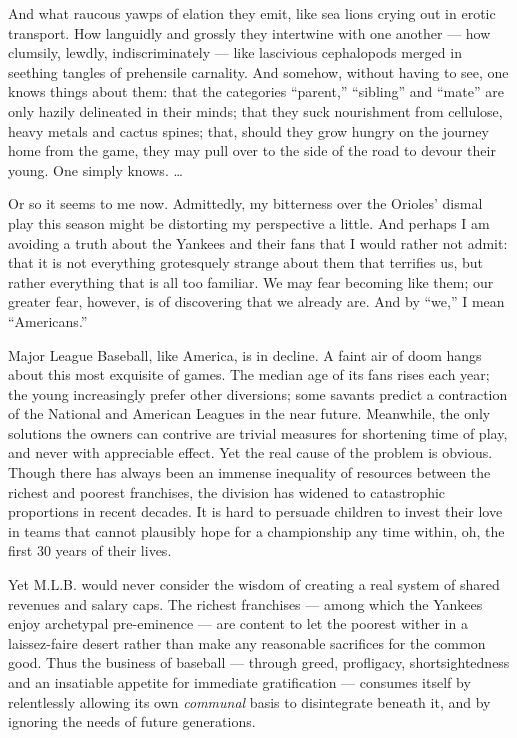 And what raucous yawps of elation they emit, like sea lions crying out
in erotic transport. How languidly and grossly they intertwine with one
another --- how clumsily, lewdly, indiscriminately --- like lascivious
cephalopods merged in seething tangles of prehensile carnality. And
somehow, without having to see, one knows things about them: that the
categories ``parent,'' ``sibling'' and ``mate'' are only hazily
delineated in their minds; that they suck nourishment from cellulose,
heavy metals and cactus spines; that, should they grow hungry on the
journey home from the game, they may pull over to the side of the road
to devour their young. One simply knows. \ldots{}

Or so it seems to me now. Admittedly, my bitterness over the Orioles'
dismal play this season might be distorting my perspective a little. And
perhaps I am avoiding a truth about the Yankees and their fans that I
would rather not admit: that it is not everything grotesquely strange
about them that terrifies us, but rather everything that is all too
familiar. We may fear becoming like them; our greater fear, however, is
of discovering that we already are. And by ``we,'' I mean ``Americans.''

Major League Baseball, like America, is in decline. A faint air of doom
hangs about this most exquisite of games. The median age of its fans
rises each year; the young increasingly prefer other diversions; some
savants predict a contraction of the National and American Leagues in
the near future. Meanwhile, the only solutions the owners can contrive
are trivial measures for shortening time of play, and never with
appreciable effect. Yet the real cause of the problem is obvious. Though
there has always been an immense inequality of resources between the
richest and poorest franchises, the division has widened to catastrophic
proportions in recent decades. It is hard to persuade children to invest
their love in teams that cannot plausibly hope for a championship any
time within, oh, the first 30 years of their lives.

Yet M.L.B. would never consider the wisdom of creating a real system of
shared revenues and salary caps. The richest franchises --- among which
the Yankees enjoy archetypal pre-eminence --- are content to let the
poorest wither in a laissez-faire desert rather than make any reasonable
sacrifices for the common good. Thus the business of baseball ---
through greed, profligacy, shortsightedness and an insatiable appetite
for immediate gratification --- consumes itself by relentlessly allowing
its own \emph{communal} basis to disintegrate beneath it, and by
ignoring the needs of future generations.

